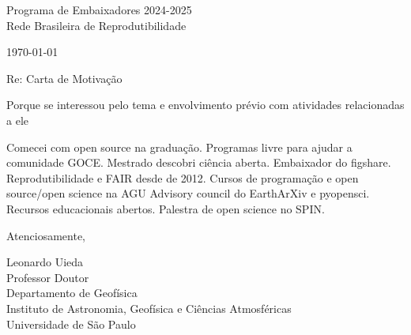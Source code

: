 \documentclass[a4paper,onecolumn,10pt]{article}
\newcommand{\Nome}{Leonardo Uieda}
\newcommand{\Cargo}{Professor Doutor}
\newcommand{\Padding}{\vspace{0.5cm}}
\begin{document}
\begin{flushleft}
  Programa de Embaixadores 2024-2025
  \\
  Rede Brasileira de Reprodutibilidade
\end{flushleft}
\begin{flushright}
  \today
\end{flushright}
\Padding

\noindent
Re: Carta de Motivação
\Padding

Porque se interessou pelo tema e
envolvimento prévio com atividades relacionadas a ele

Comecei com open source na graduação.
Programas livre para ajudar a comunidade GOCE.
Mestrado descobri ciência aberta.
Embaixador do figshare.
Reprodutibilidade e FAIR desde de 2012.
Cursos de programação e open source/open science na AGU
Advisory council do EarthArXiv e pyopensci.
Recursos educacionais abertos.
Palestra de open science no SPIN.
\Padding

\begin{flushleft}
  Atenciosamente,

  \Padding
  \Nome{}
  \\[0.25cm]
  {
    \color{mediumgray}
    \small
    \Cargo
    \\
    Departamento de Geofísica
    \\
    Instituto de Astronomia, Geofísica e Ciências Atmosféricas
    \\
    Universidade de São Paulo
  }
\end{flushleft}
\end{document}
